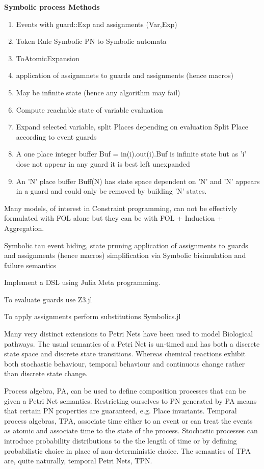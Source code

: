 {\bf Symbolic process Methods}
 \begin{enumerate}
 \item    Events with guard::Exp and assignments (Var,Exp)
 \item    Token Rule Symbolic PN  to Symbolic automata
  \item   ToAtomicExpansion
 \item       application of assignmnets to guards and assignments (hence macros)
 \item       May be infinite state  (hence any algorithm may fail)
 \item          Compute reachable state of variable evaluation  
 \item          Expand selected variable, split Places depending on evaluation 
    Split Place according to event guards
 \item        A one place integer buffer Buf = in(i).out(i).Buf is infinite state
       but as 'i' dose not appear in any guard it is best left unexpanded
  \item       An 'N' place buffer Buff(N) has state space dependent on 'N' and 'N' appears in a guard and       could only be removed by building 'N' states.

\end{enumerate}
Many models, of interest in Constraint programming,  can not be effectivly  formulated with FOL alone
  but they can be with  FOL + Induction + Aggregation.


    Symbolic tau event hiding, state pruning
        application of assignments to guards and assignments (hence macros)
    simplification via Symbolic bisimulation and failure semantics

Implement a DSL using Julia Meta programming.

To evaluate guards  use Z3.jl

To apply assignments  perform substitutions   Symbolics.jl

Many very distinct extensions to Petri Nets  have been used to model  Biological pathways. The usual semantics of a Petri Net is un-timed and has both a discrete state space and discrete state transitions. Whereas chemical reactions exhibit both  stochastic behaviour,  temporal behaviour and continuous change rather than discrete state change.

Process algebra,  PA, can be used to define composition  processes that can be  given a Petri Net semantics. Restricting ourselves to PN generated by PA means that certain PN properties are guaranteed, e.g. Place invariants. Temporal  process algebras, TPA, associate time either to  an event or can treat the events as atomic and associate time to the state of the process. Stochastic processes can introduce probability distributions to the the length of time or by defining probabilistic choice in place of non-deterministic choice. The semantics of TPA are, quite naturally, temporal Petri Nets, TPN.

